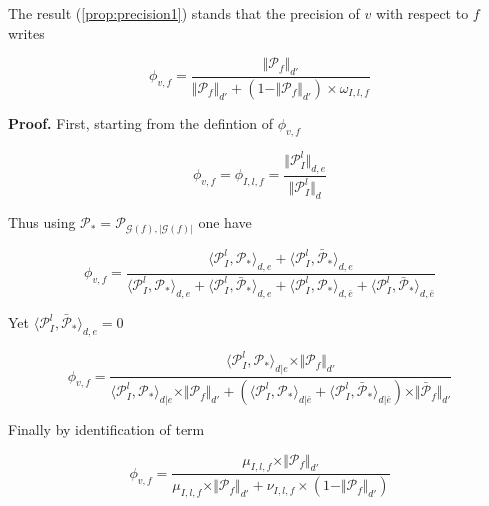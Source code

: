 \documentclass[a4paper, 11pt]{article}
\begin{document}
The result (\ref{prop:precision1}) stands that the precision of $v$ with respect to $f$ writes

\begin{equation*}
\phi_{v, f} = \frac{\Vert \mathcal{P}_{f} \Vert_{d'}}{\Vert \mathcal{P}_{f} \Vert_{d'} + (1 - \Vert \mathcal{P}_{f} \Vert_{d'}) \times \omega_{I, l, f}}
\end{equation*}

\textbf{Proof.} First, starting from the defintion of $\phi_{v, f}$

\begin{equation*}
\phi_{v, f} = \phi_{I, l, f} = \frac{\Vert \mathcal{P}_{I}^{l} \Vert_{d, e}}{\Vert \mathcal{P}_{I}^{l} \Vert_{d}}
\end{equation*}

Thus using $\mathcal{P}_{*} = \mathcal{P}_{\mathcal{G}(f), \vert \mathcal{G}(f) \vert}$ one have

\begin{equation*}
\phi_{v, f} = \frac{\langle \mathcal{P}_{I}^{l}, \mathcal{P}_{*} \rangle_{d, e} + \langle \mathcal{P}_{I}^{l}, \bar{\mathcal{P}}_{*} \rangle_{d, e} }{\langle \mathcal{P}_{I}^{l}, \mathcal{P}_{*} \rangle_{d, e} + \langle \mathcal{P}_{I}^{l}, \bar{\mathcal{P}}_{*} \rangle_{d, e} + \langle \mathcal{P}_{I}^{l}, \mathcal{P}_{*} \rangle_{d, \bar{e}} + \langle \mathcal{P}_{I}^{l}, \bar{\mathcal{P}}_{*} \rangle_{d, \bar{e}}}
\end{equation*}

Yet $\langle \mathcal{P}_{I}^{l}, \bar{\mathcal{P}}_{*} \rangle_{d, e} = 0$

\begin{equation*}
\phi_{v, f} = \frac{\langle \mathcal{P}_{I}^{l}, \mathcal{P}_{*} \rangle_{d \vert e} \times \Vert \mathcal{P}_{f} \Vert_{d'} }{\langle \mathcal{P}_{I}^{l}, \mathcal{P}_{*} \rangle_{d \vert e} \times \Vert \mathcal{P}_{f} \Vert_{d'} + \left( \langle \mathcal{P}_{I}^{l}, \mathcal{P}_{*} \rangle_{d \vert \bar{e}} + \langle \mathcal{P}_{I}^{l}, \bar{\mathcal{P}}_{*} \rangle_{d \vert \bar{e}} \right)\times \Vert \bar{\mathcal{P}}_{f} \Vert_{d'}} 
\end{equation*}

Finally by identification of term

\begin{equation*}
\phi_{v, f} = \frac{\mu_{I, l, f} \times \Vert \mathcal{P}_{f} \Vert_{d'} }{\mu_{I, l, f} \times \Vert \mathcal{P}_{f} \Vert_{d'} + \nu_{I, l, f} \times \left( 1 -  \Vert \mathcal{P}_{f} \Vert_{d'} \right)}
\end{equation*}
\end{document}
